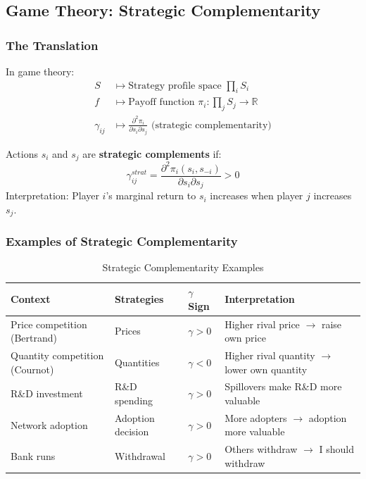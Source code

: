 \subsection{Game Theory: Strategic Complementarity}

\subsubsection{The Translation}

\begin{axiom}
In game theory:
\begin{align}
S &\mapsto \text{Strategy profile space } \prod_{i} S_i \\
f &\mapsto \text{Payoff function } \pi_i: \prod_j S_j \to \mathbb{R} \\
\gamma_{ij} &\mapsto \frac{\partial^2 \pi_i}{\partial s_i \partial s_j} \text{ (strategic complementarity)}
\end{align}
\end{axiom}

\begin{definition}
Actions $s_i$ and $s_j$ are \textbf{strategic complements} if:
\begin{equation}
\gamma^{strat}_{ij} = \frac{\partial^2 \pi_i(s_i, s_{-i})}{\partial s_i \partial s_j} > 0
\end{equation}
Interpretation: Player $i$'s marginal return to $s_i$ increases when player $j$ increases $s_j$.
\end{definition}

\subsubsection{Examples of Strategic Complementarity}

\begin{table}[h]
\centering
\caption{Strategic Complementarity Examples}
\label{tab:strategic-gamma}
\renewcommand{\arraystretch}{1.3}
\small
\begin{tabular}{@{}p{3cm}p{3cm}p{2.5cm}p{3.5cm}@{}}
\toprule
\textbf{Context} & \textbf{Strategies} & \textbf{$\gamma$ Sign} & \textbf{Interpretation} \\
\midrule
Price competition (Bertrand) & Prices & $\gamma > 0$ & Higher rival price $\to$ raise own price \\
Quantity competition (Cournot) & Quantities & $\gamma < 0$ & Higher rival quantity $\to$ lower own quantity \\
R\&D investment & R\&D spending & $\gamma > 0$ & Spillovers make R\&D more valuable \\
Network adoption & Adoption decision & $\gamma > 0$ & More adopters $\to$ adoption more valuable \\
Bank runs & Withdrawal & $\gamma > 0$ & Others withdraw $\to$ I should withdraw \\
\bottomrule
\end{tabular}
\end{table}

